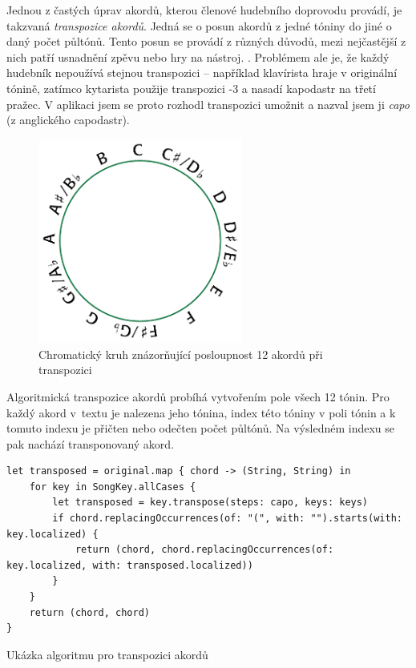 Jednou z častých úprav akordů, kterou členové hudebního doprovodu provádí, je takzvaná \textit{transpozice akordů}. Jedná se o posun akordů z jedné tóniny do jiné o daný počet půltónů. Tento posun se provádí z různých důvodů, mezi nejčastější z nich patří usnadnění zpěvu nebo hry na nástroj. \cite{transpozice}. Problémem ale je, že každý hudebník nepoužívá stejnou transpozici -- například klavírista hraje v originální tónině, zatímco kytarista použije transpozici -3 a nasadí kapodastr na třetí pražec. V aplikaci jsem se proto rozhodl transpozici umožnit a nazval jsem ji \textit{capo} (z anglického capodastr).

\begin{figure}[H]
    \centering
    \includegraphics[width=0.6\textwidth]{images/5-implementace/5-6-chromaticky-kruh.pdf}
    \caption[Chromatický kruh znázorňující posloupnost akordů při transpozici]{Chromatický kruh znázorňující posloupnost 12 akordů při transpozici \cite{chromatic-circle}}
\end{figure}

Algoritmická transpozice akordů probíhá vytvořením pole všech 12 tónin. Pro každý akord v~textu je nalezena jeho tónina, index této tóniny v poli tónin a k tomuto indexu je přičten nebo odečten počet půltónů. Na výsledném indexu se pak nachází transponovaný akord.

\begin{listing}[H]
\begin{verbatim}
let transposed = original.map { chord -> (String, String) in
    for key in SongKey.allCases {
        let transposed = key.transpose(steps: capo, keys: keys)
        if chord.replacingOccurrences(of: "(", with: "").starts(with: key.localized) {
            return (chord, chord.replacingOccurrences(of: key.localized, with: transposed.localized))
        }
    }
    return (chord, chord)
}
\end{verbatim}
\caption{Ukázka algoritmu pro transpozici akordů}
\end{listing}

